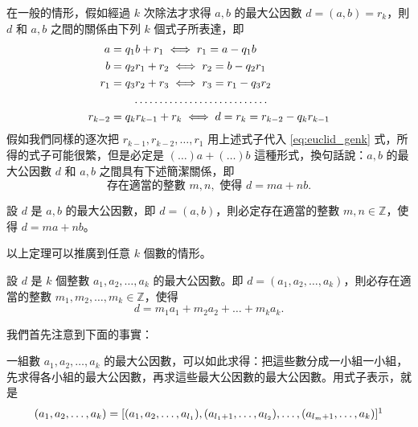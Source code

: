 在一般的情形，假如經過 $k$ 次除法才求得 $a, b$ 的最大公因數 $d=(a, b)=r_k$，則 $d$ 和 $a, b$ 之間的關係由下列 $k$ 個式子所表達，即
\begin{align}
  a &= q_1 b + r_1 \iff r_1 = a - q_1 b \label{eq:euclid_gen1} \\
  b &= q_2 r_1 + r_2 \iff r_2 = b - q_2 r_1 \label{eq:euclid_gen2} \\
  r_1 &= q_3 r_2 + r_3 \iff r_3 = r_1 - q_3 r_2 \label{eq:euclid_gen3} \\
  &\qquad \dots\dots\dots\dots\dots\dots\dots\dots\dots \notag \\
  r_{k-2} &= q_k r_{k-1} + r_k \iff d = r_k = r_{k-2} - q_k r_{k-1} \label{eq:euclid_genk}
\end{align}
假如我們同樣的逐次把 $r_{k-1}, r_{k-2}, \dots, r_1$ 用上述式子代入 \eqref{eq:euclid_genk} 式，所得的式子可能很繁，但是必定是 $(\dots)a + (\dots)b$ 這種形式，換句話說：$a, b$ 的最大公因數 $d$ 和 $a, b$ 之間具有下述簡潔關係，即
\begin{equation*}
  \text{存在適當的整數 } m, n, \text{ 使得 } d = ma + nb.
\end{equation*}

\begin{theorem}\label{thm:bezout_2}
設 $d$ 是 $a, b$ 的最大公因數，即 $d=(a, b)$，則必定存在適當的整數 $m, n \in \mathbb{Z}$，使得 $d=ma+nb$。
\end{theorem}

以上定理可以推廣到任意 $k$ 個數的情形。

\begin{theorem}\label{thm:bezout_k}
設 $d$ 是 $k$ 個整數 $a_1, a_2, \dots, a_k$ 的最大公因數。即 $d=(a_1, a_2, \dots, a_k)$，則必存在適當的整數 $m_1, m_2, \dots, m_k \in \mathbb{Z}$，使得
\begin{equation*}
  d = m_1 a_1 + m_2 a_2 + \dots + m_k a_k.
\end{equation*}
\end{theorem}

我們首先注意到下面的事實：

\begin{lemma}\label{lem:gcd_grouping}
一組數 $a_1, a_2, \dots, a_k$ 的最大公因數，可以如此求得：把這些數分成一小組一小組，先求得各小組的最大公因數，再求這些最大公因數的最大公因數。用式子表示，就是
\label{note:ch6-gcd-bracket}
\begin{equation*}
  (a_1, a_2, \dots, a_k) = [(a_1, a_2, \dots, a_{l_1}), (a_{l_1+1}, \dots, a_{l_2}), \dots, (a_{l_m+1}, \dots, a_k)]\footnotemark
\end{equation*}
\end{lemma}

